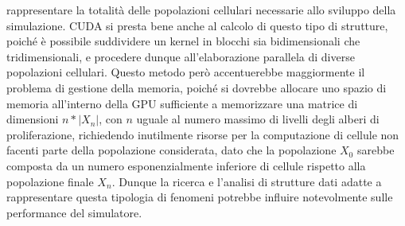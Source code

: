 rappresentare la totalità delle popolazioni cellulari necessarie allo sviluppo 
della simulazione. CUDA si presta bene anche al calcolo di questo tipo di 
strutture, poiché è possibile suddividere un kernel in blocchi sia 
bidimensionali che tridimensionali, e procedere dunque all'elaborazione 
parallela di diverse popolazioni cellulari.
Questo metodo però accentuerebbe maggiormente il problema di gestione della 
memoria, poiché si dovrebbe allocare uno spazio di memoria all'interno della 
GPU sufficiente a memorizzare una matrice di dimensioni $n * |X_{n}|$, con 
$n$ uguale al numero massimo di livelli degli alberi di proliferazione, 
richiedendo inutilmente risorse per la computazione di cellule non 
facenti parte della popolazione considerata, dato che la popolazione $X_{0}$ 
sarebbe composta da un numero esponenzialmente inferiore di cellule rispetto 
alla popolazione finale $X_{n}$. Dunque la ricerca e 
l'analisi di strutture dati adatte a rappresentare questa tipologia di 
fenomeni potrebbe influire notevolmente sulle performance del simulatore.
